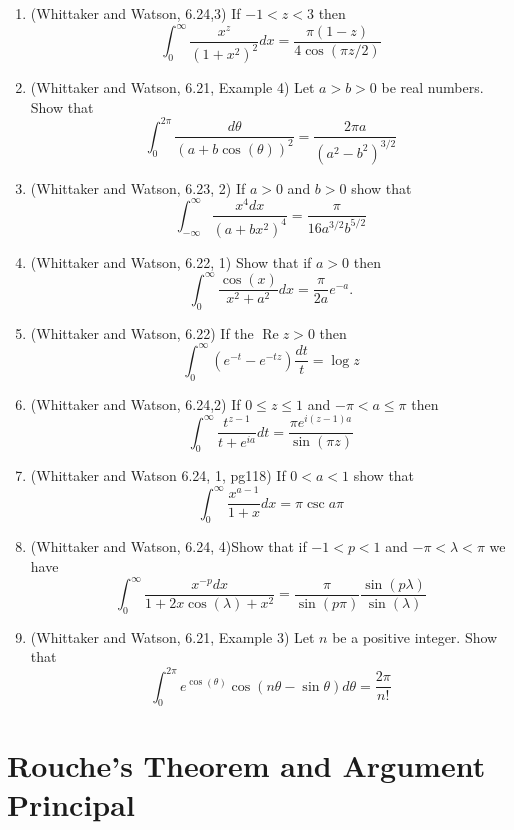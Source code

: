 \documentclass[a4paper,10pt]{article}
\renewcommand{\Re}{\operatorname{Re}}
\begin{document}
\begin{enumerate}
		\item (Whittaker and Watson, 6.24,3)
	If $-1 < z < 3$ then 
	$$ \int_0^{\infty} \frac{x^z}{(1+x^2)^2}dx = \frac{\pi (1-z) }{4 \cos( \pi z/2) }$$
	
	\item (Whittaker and Watson, 6.21, Example 4)
	Let $a>b>0$ be real numbers. 
	Show that 
	$$ \int_0^{2\pi} \frac{d\theta}{(a+b\cos(\theta))^2} = \frac{2\pi a}{(a^2-b^2)^{3/2}}$$
	
	
	\item (Whittaker and Watson, 6.23, 2) If $a>0$ and $b>0$ show that 
	$$ \int_{-\infty}^{\infty} \frac{x^4dx}{(a+bx^2)^4} = \frac{\pi}{16 a^{3/2}b^{5/2}}$$
	
	\item (Whittaker and Watson, 6.22, 1) Show that if $a>0$ then 
	$$ \int_0^{\infty} \frac{\cos(x)}{x^2+a^2}dx = \frac{\pi}{2a}e^{-a}. $$
	
	
	\item (Whittaker and Watson, 6.22)
	If the $\Re z >0$ then 
	$$ \int_0^{\infty} (e^{-t} - e^{-tz}) \frac{dt}{t} = \log z $$
	
	\item (Whittaker and Watson, 6.24,2) If $0 \leq z \leq 1$ and $-\pi< a \leq \pi$ then
	$$\int_0^{\infty} \frac{t^{z-1}}{t + e^{ia} }dt  = \frac{\pi e^{i(z-1)a}}{\sin(\pi z)} $$
	
	
	\item (Whittaker and Watson 6.24, 1, pg118)
	If $0<a<1$ show that 
	$$ \int_0^{\infty} \frac{x^{a-1}}{1+x}dx = \pi \csc a \pi $$
	
	
	\item (Whittaker and Watson, 6.24, 4)Show that if $-1<p<1$ and $-\pi<\lambda<\pi$ we have 
	$$ \int_0^{\infty} \frac{x^{-p} dx}{1 + 2x \cos(\lambda) + x^2 } = \frac{\pi}{\sin(p\pi)} \frac{\sin(p\lambda)}{\sin(\lambda)}$$
	
	\item  (Whittaker and Watson, 6.21, Example 3)
	Let $n$ be a positive integer. 
	Show that 
	$$ \int_0^{2\pi} e^{\cos(\theta)} \cos(n\theta - \sin\theta)d\theta = \frac{2\pi}{n!}$$
\end{enumerate}

\section{Rouche's Theorem and Argument Principal}
\end{document}
